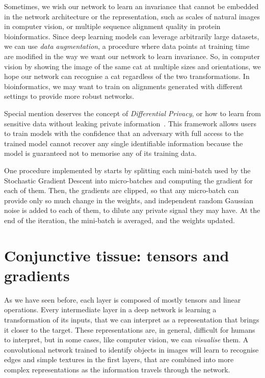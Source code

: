 Sometimes,  we wish our network to learn an invariance that cannot be embedded in the network architecture or the representation, such as scales of natural images in computer vision, or multiple sequence alignment quality in protein bioinformatics.
Since deep learning models can leverage arbitrarily large datasets, we can use \emph{data augmentation}, a procedure where data points at training time are modified in the way we want our network to learn invariance.
So, in computer vision by showing the image of the same cat at multiple sizes and orientations, we hope our network can recognise a cat regardless of the two transformations.
In bioinformatics, we may want to train on alignments generated with different settings to provide more robust networks.

Special mention deserves the concept of \emph{Differential Privacy}, 
or how to learn from sensitive data without leaking private information~\citep{differential_privacy}.
This framework allows users to train models with the confidence that an adversary with full access to the trained model cannot recover any single identifiable information because the model is guaranteed not to memorise any of its training data.

One procedure implemented by \citet{tf_privacy} starts by splitting each mini-batch used by the Stochastic Gradient Descent into micro-batches and computing the gradient for each of them.
Then, the gradients are clipped, so that any micro-batch can provide only so much change in the weights, and independent random Gaussian noise is added to each of them, to dilute any private signal they may have.
At the end of the iteration, the mini-batch is averaged, and the weights updated.


\section[Tensors and gradients]{Conjunctive tissue: tensors and gradients}\label{sec:tensors}
As we have seen before, each layer is composed of mostly tensors and linear operations.
Every intermediate layer in a deep network is learning a transformation of its inputs, that we can interpret as a representation that brings it closer to the target.
These representations are, in general, difficult for humans to interpret, but in some cases, like computer vision, we can \emph{visualise} them.
A convolutional network trained to identify objects in images will learn to recognise edges and simple textures in the first layers, that are combined into more complex representations as the information travels through the network.

